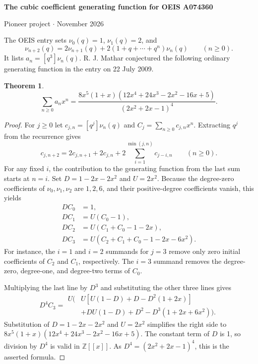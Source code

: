 \documentclass[11pt]{article}
\newtheorem{theorem}{Theorem}
\begin{document}
\begin{center}
{\Large\bfseries The cubic coefficient generating function for OEIS A074360}\par
\medskip
Pioneer project \quad $\cdot$  November 2026
\end{center}

\begin{abstract}
The first four coefficient sequences of a polynomial recurrence satisfy a triangular system of ordinary generating functions. Solving that system proves R. J. Mathar's conjectured rational generating function for the cubic coefficients in OEIS A074360.
\end{abstract}

The OEIS entry \cite{oeis} sets \(\nu_0(q)=1\), \(\nu_1(q)=2\), and
\[
\nu_{n+2}(q)=2\nu_{n+1}(q)+2(1+q+\cdots+q^n)\nu_n(q)
\qquad(n\ge0).
\]
It lists \(a_n=[q^3]\nu_n(q)\). R. J. Mathar conjectured the following ordinary generating function in the entry on 22 July 2009.

\begin{theorem}
\[
\sum_{n\ge0}a_nx^n
=\frac{8x^5(1+x)(12x^4+24x^3-2x^2-16x+5)}
{(2x^2+2x-1)^4}.
\]
\end{theorem}

\begin{proof}
For \(j\ge0\) let \(c_{j,n}=[q^j]\nu_n(q)\) and \(C_j=\sum_{n\ge0}c_{j,n}x^n\). Extracting \(q^j\) from the recurrence gives
\[
c_{j,n+2}=2c_{j,n+1}+2c_{j,n}
  +2\sum_{i=1}^{\min(j,n)}c_{j-i,n}\qquad(n\ge0).
\]
For any fixed \(i\), the contribution to the generating function from the last sum starts at \(n=i\). Set \(D=1-2x-2x^2\) and \(U=2x^2\). Because the degree-zero coefficients of \(\nu_0,\nu_1,\nu_2\) are \(1,2,6\), and their positive-degree coefficients vanish, this yields
\begin{align*}
D C_0 &= 1,\\
D C_1 &= U (C_0-1),\\
D C_2 &= U (C_1+C_0-1-2x),\\
D C_3 &= U (C_2+C_1+C_0-1-2x-6x^2).
\end{align*}
For instance, the \(i=1\) and \(i=2\) summands for \(j=3\) remove only zero initial coefficients of \(C_2\) and \(C_1\), respectively. The \(i=3\) summand removes the degree-zero, degree-one, and degree-two terms of \(C_0\).

Multiplying the last line by \(D^3\) and substituting the other three lines gives
\[
D^4 C_3=
\begin{aligned}U\bigl(&U[U(1-D)+D-D^2(1+2x)]\\
       &+DU(1-D)+D^2-D^3(1+2x+6x^2)\bigr).\end{aligned}
\]
Substitution of \(D=1-2x-2x^2\) and \(U=2x^2\) simplifies the right side to \(8x^5(1+x)(12x^4+24x^3-2x^2-16x+5)\). The constant term of \(D\) is 1, so division by \(D^4\) is valid in \(\mathbb Z[[x]]\). As \(D^4=(2x^2+2x-1)^4\), this is the asserted formula.
\end{proof}
\end{document}
